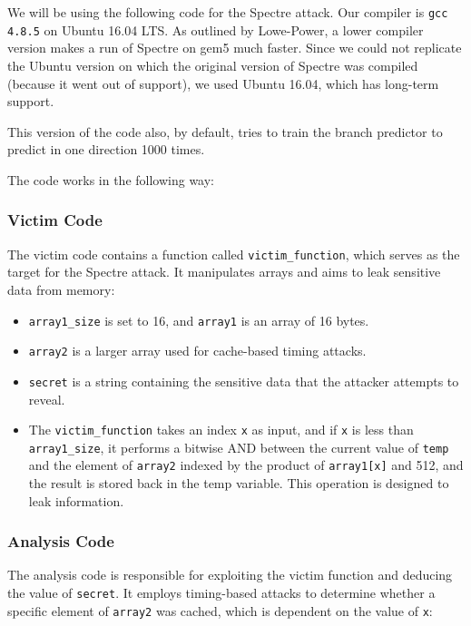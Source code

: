 \documentclass[twocolumn,showpacs,%
  nofootinbib,aps,superscriptaddress,%
  eqsecnum,prd,notitlepage,showkeys,10pt]{revtex4-1}
\begin{document}
We will be using the following code for the Spectre attack\cite{SPECTREPRog}. Our compiler is \texttt{gcc 4.8.5} on Ubuntu 16.04 LTS. As outlined by Lowe-Power\cite{jasonspectre}, a lower compiler version makes a run of Spectre on gem5 much faster. Since we could not replicate the Ubuntu version on which the original version of Spectre was compiled (because it went out of support), we used Ubuntu 16.04, which has long-term support.

This version of the code also, by default, tries to train the branch predictor to predict in one direction 1000 times.

The code works in the following way:

\subsubsection{Victim Code}
The victim code contains a function called \texttt{victim\_function}, which serves as the target for the Spectre attack. It manipulates arrays and aims to leak sensitive data from memory:

\begin{itemize}
  \item \texttt{array1\_size} is set to 16, and \texttt{array1} is an array of 16 bytes.
  \item \texttt{array2} is a larger array used for cache-based timing attacks.
  \item \texttt{secret} is a string containing the sensitive data that the attacker attempts to reveal.
  \item The \texttt{victim\_function} takes an index \texttt{x} as input, and if \texttt{x} is less than \texttt{array1\_size}, it performs a bitwise AND between the current value of \texttt{temp} and the element of \texttt{array2} indexed by the product of \texttt{array1[x]} and 512, and the result is stored back in the temp variable. This operation is designed to leak information.
\end{itemize}

\subsubsection{Analysis Code}
The analysis code is responsible for exploiting the victim function and deducing the value of \texttt{secret}. It employs timing-based attacks to determine whether a specific element of \texttt{array2} was cached, which is dependent on the value of \texttt{x}:
\end{document}
